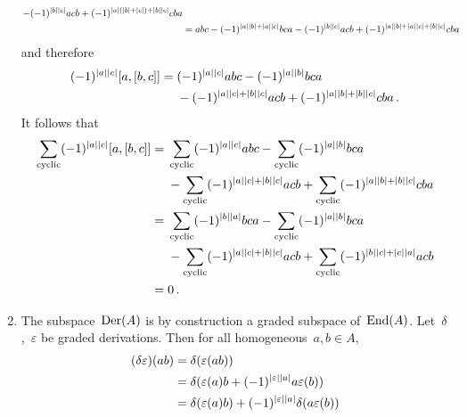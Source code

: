 \begin{enumerate}
\begin{align*}
      - (-1)^{\lvert b\rvert \lvert c\rvert} acb
      + (-1)^{\lvert a\rvert (\lvert b\rvert + \lvert c\rvert) + \lvert b\rvert \lvert c\rvert} cba
      \\
      &=
        abc
      - (-1)^{\lvert a\rvert \lvert b\rvert + \lvert a\rvert \lvert c\rvert} bca
      - (-1)^{\lvert b\rvert \lvert c\rvert} acb
      + (-1)^{\lvert a\rvert \lvert b\rvert + \lvert a\rvert \lvert c\rvert + \lvert b\rvert \lvert c\rvert} cba
    \end{align*}
    \endgroup
    and therefore
    \begin{align*}
      (-1)^{\lvert a\rvert \lvert c\rvert} [a,[b,c]]
      ={}&
        (-1)^{\lvert a\rvert \lvert c\rvert} abc
      - (-1)^{\lvert a\rvert \lvert b\rvert} bca
      \\
      {}&
      - (-1)^{\lvert a\rvert \lvert c\rvert + \lvert b\rvert \lvert c\rvert} acb
      + (-1)^{\lvert a\rvert \lvert b\rvert + \lvert b\rvert \lvert c\rvert} cba \,.
    \end{align*}
    It follows that
    \begin{align*}
      \sum_{\text{cyclic}}
      (-1)^{\lvert a\rvert \lvert c\rvert} [a,[b,c]]
      ={}&
        \sum_{\text{cyclic}} (-1)^{\lvert a\rvert \lvert c\rvert} abc
      - \sum_{\text{cyclic}} (-1)^{\lvert a\rvert \lvert b\rvert} bca
      \\
      {}&
      - \sum_{\text{cyclic}} (-1)^{\lvert a\rvert \lvert c\rvert + \lvert b\rvert \lvert c\rvert} acb
      + \sum_{\text{cyclic}} (-1)^{\lvert a\rvert \lvert b\rvert + \lvert b\rvert \lvert c\rvert} cba
      \\
      ={}&
        \sum_{\text{cyclic}} (-1)^{\lvert b\rvert \lvert a\rvert} bca
      - \sum_{\text{cyclic}} (-1)^{\lvert a\rvert \lvert b\rvert} bca
      \\
      {}&
      - \sum_{\text{cyclic}} (-1)^{\lvert a\rvert \lvert c\rvert + \lvert b\rvert \lvert c\rvert} acb
      + \sum_{\text{cyclic}} (-1)^{\lvert b\rvert \lvert c\rvert + \lvert c\rvert \lvert a\rvert} acb
      \\
      ={}&
      0 \,.
    \end{align*}
  \item
    The subspace~$\operatorname{Der}(A)$ is by construction a graded subspace of~$\operatorname{End}(A)$.
    Let~$\delta$,~$\varepsilon$ be graded derivations.
    Then for all homogeneous~$a, b \in A$,
    \begingroup
    \allowdisplaybreaks
    \begin{align*}
      (\delta \varepsilon)(ab)
      ={}&
      \delta( \varepsilon(ab) )
      \\
      ={}&
      \delta( \varepsilon(a) b + (-1)^{\hdeg{\varepsilon} \hdeg{a}} a \varepsilon(b) )
      \\
      ={}&
        \delta( \varepsilon(a) b )
      + (-1)^{\hdeg{\varepsilon} \hdeg{a}}
        \delta( a \varepsilon(b) )
      \\

\end{align*}
\end{enumerate}
